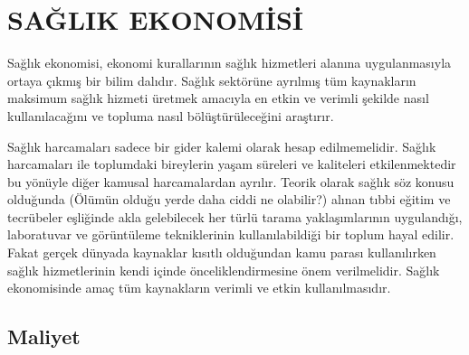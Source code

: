 \section{SAĞLIK EKONOMİSİ}

Sağlık ekonomisi, ekonomi kurallarının sağlık hizmetleri alanına uygulanmasıyla ortaya çıkmış bir bilim dalıdır. Sağlık sektörüne ayrılmış tüm kaynakların maksimum sağlık hizmeti üretmek amacıyla en etkin ve verimli şekilde nasıl kullanılacağını ve topluma nasıl bölüştürüleceğini araştırır.
 
Sağlık harcamaları sadece bir gider kalemi olarak hesap edilmemelidir. Sağlık harcamaları ile toplumdaki bireylerin yaşam süreleri ve kaliteleri etkilenmektedir bu yönüyle diğer kamusal harcamalardan ayrılır. Teorik olarak sağlık söz konusu olduğunda (Ölümün olduğu yerde daha ciddi ne olabilir?) alınan tıbbi eğitim ve tecrübeler eşliğinde akla gelebilecek her türlü tarama yaklaşımlarının uygulandığı, laboratuvar ve görüntüleme tekniklerinin kullanılabildiği bir toplum hayal edilir. Fakat gerçek dünyada kaynaklar kısıtlı olduğundan kamu parası kullanılırken sağlık hizmetlerinin kendi içinde önceliklendirmesine önem verilmelidir. Sağlık ekonomisinde amaç tüm kaynakların verimli ve etkin kullanılmasıdır. 

\subsection{Maliyet} 

